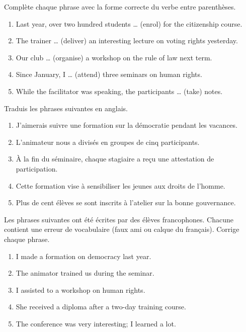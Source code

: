\documentclass[11pt]{article}
\newcommand{\cle}[1]{{\popxbold\color{popdark}#1}}
\newcounter{popsec}
\newcounter{popsub}
\newcommand{\courssub}[1]{%
  \stepcounter{popsub}%
  \par\vspace{9pt}\noindent{\popxbold\fontsize{11.5}{13}\selectfont\color{popink}{\color{poporange}\thepopsec.\thepopsub}\hspace{6pt}#1}\par\nopagebreak\vspace{4pt}
}
\begin{document}
\begin{exercice}
Complète chaque phrase avec la forme correcte du verbe entre parenthèses.

\begin{enumerate}
\item Last year, over two hundred students \cle{\dots} (enrol) for the citizenship course.
\item The trainer \cle{\dots} (deliver) an interesting lecture on voting rights yesterday.
\item Our club \cle{\dots} (organise) a workshop on the rule of law next term.
\item Since January, I \cle{\dots} (attend) three seminars on human rights.
\item While the facilitator was speaking, the participants \cle{\dots} (take) notes.
\end{enumerate}
\end{exercice}

\courssub{Je m'entraîne}

\begin{exercice}[Traduction]
Traduis les phrases suivantes en anglais.

\begin{enumerate}
\item J'aimerais suivre une formation sur la démocratie pendant les vacances.
\item L'animateur nous a divisés en groupes de cinq participants.
\item À la fin du séminaire, chaque stagiaire a reçu une attestation de participation.
\item Cette formation vise à sensibiliser les jeunes aux droits de l'homme.
\item Plus de cent élèves se sont inscrits à l'atelier sur la bonne gouvernance.
\end{enumerate}
\end{exercice}

\begin{exercice}
Les phrases suivantes ont été écrites par des élèves francophones. Chacune contient une erreur de vocabulaire (faux ami ou calque du français). Corrige chaque phrase.

\begin{enumerate}
\item I made a formation on democracy last year.
\item The animator trained us during the seminar.
\item I assisted to a workshop on human rights.
\item She received a diploma after a two-day training course.
\item The conference was very interesting; I learned a lot.
\end{enumerate}
\end{exercice}
\end{document}
